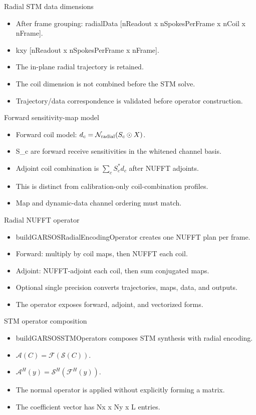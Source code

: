 \documentclass[aspectratio=169,professionalfonts]{beamer}
\begin{document}
\begin{frame}{Radial STM data dimensions}
\begin{itemize}
\item After frame grouping: radialData [nReadout x nSpokesPerFrame x nCoil x nFrame].
\item kxy [nReadout x nSpokesPerFrame x nFrame].
\item The in-plane radial trajectory is retained.
\item The coil dimension is not combined before the STM solve.
\item Trajectory/data correspondence is validated before operator construction.
\end{itemize}
\end{frame}
\begin{frame}{Forward sensitivity-map model}
\begin{itemize}
\item Forward coil model: $d_c={\cal N}_{\rm radial}(S_c\odot X)$.
\item S\_c are forward receive sensitivities in the whitened channel basis.
\item Adjoint coil combination is $\sum_c S_c^* d_c$ after NUFFT adjoints.
\item This is distinct from calibration-only coil-combination profiles.
\item Map and dynamic-data channel ordering must match.
\end{itemize}
\end{frame}
\begin{frame}{Radial NUFFT operator}
\begin{itemize}
\item buildGARSOSRadialEncodingOperator creates one NUFFT plan per frame.
\item Forward: multiply by coil maps, then NUFFT each coil.
\item Adjoint: NUFFT-adjoint each coil, then sum conjugated maps.
\item Optional single precision converts trajectories, maps, data, and outputs.
\item The operator exposes forward, adjoint, and vectorized forms.
\end{itemize}
\end{frame}
\begin{frame}{STM operator composition}
\begin{itemize}
\item buildGARSOSSTMOperators composes STM synthesis with radial encoding.
\item $\mathcal{A}(C)=\mathcal{F}(\mathcal{S}(C))$.
\item $\mathcal{A}^H(y)=\mathcal{S}^H(\mathcal{F}^H(y))$.
\item The normal operator is applied without explicitly forming a matrix.
\item The coefficient vector has Nx x Ny x L entries.
\end{itemize}
\end{frame}
\end{document}
